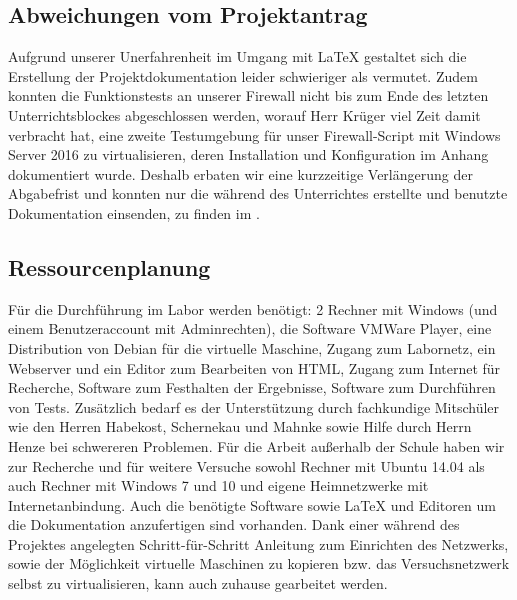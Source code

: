 \subsection{Abweichungen vom Projektantrag}
\label{sec:AbweichungenProjektantrag}

Aufgrund unserer Unerfahrenheit im Umgang mit \LaTeX{} gestaltet sich die Erstellung der Projektdokumentation leider schwieriger als vermutet. Zudem konnten die Funktionstests an unserer Firewall nicht bis zum Ende des letzten Unterrichtsblockes abgeschlossen werden, worauf Herr Krüger viel Zeit damit verbracht hat, eine zweite Testumgebung für unser Firewall-Script mit Windows Server 2016 zu virtualisieren, deren Installation und Konfiguration im Anhang dokumentiert wurde. Deshalb erbaten wir  eine kurzzeitige Verlängerung der Abgabefrist und konnten nur die während des Unterrichtes erstellte und benutzte Dokumentation einsenden, zu finden im .

\subsection{Ressourcenplanung}
\label{sec:Ressourcenplanung}

Für die Durchführung im Labor werden benötigt: 2 Rechner mit Windows (und einem Benutzeraccount mit Adminrechten), die Software VMWare Player, eine Distribution von Debian für die virtuelle Maschine, Zugang zum Labornetz, ein Webserver und ein Editor zum Bearbeiten von \ac{HTML}, Zugang zum Internet für Recherche, Software zum Festhalten der Ergebnisse, Software zum Durchführen von Tests. Zusätzlich bedarf es der Unterstützung durch fachkundige Mitschüler wie den Herren Habekost, Schernekau und Mahnke sowie Hilfe durch Herrn Henze bei schwereren Problemen.
Für die Arbeit außerhalb der Schule haben wir zur Recherche und für weitere Versuche sowohl Rechner mit Ubuntu 14.04 als auch Rechner mit Windows 7 und 10 und eigene Heimnetzwerke mit Internetanbindung. Auch die benötigte Software sowie \LaTeX{} und Editoren um die Dokumentation anzufertigen sind vorhanden. Dank einer während des Projektes angelegten Schritt-für-Schritt Anleitung zum Einrichten des Netzwerks, sowie der Möglichkeit virtuelle Maschinen zu kopieren bzw. das Versuchsnetzwerk selbst zu virtualisieren, kann auch zuhause gearbeitet werden.

